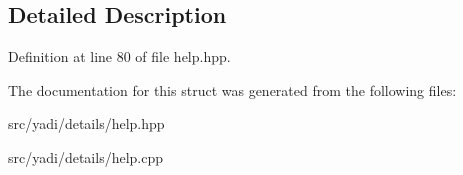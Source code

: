 \subsection{Detailed Description}


Definition at line 80 of file help.\+hpp.



The documentation for this struct was generated from the following files\+:\begin{DoxyCompactItemize}
\item 
src/yadi/details/help.\+hpp\item 
src/yadi/details/help.\+cpp\end{DoxyCompactItemize}
